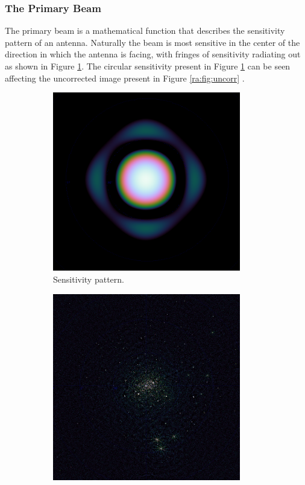 \subsubsection{The Primary Beam}\label{ra:ssec:tpb}
The primary beam is a mathematical function that describes the sensitivity pattern of an antenna. Naturally the beam is most sensitive in the center of the direction in which the antenna is facing, with fringes of sensitivity radiating out as shown in Figure \ref{ra:fig:beam}. The circular sensitivity present in Figure \ref{ra:fig:beam} can be seen affecting the uncorrected image present in Figure \ref{ra:fig:uncorr} \citep{thompson2008interferometry}.
%
\begin{figure}[H]
  \begin{subfigure}{0.45\textwidth}
	\centering
	\includegraphics[width=0.9\textwidth]{Images/beam.png}
	\caption{Sensitivity pattern.}
	\label{ra:fig:beam}
  \end{subfigure}
  \begin{subfigure}{0.45\textwidth}
	\centering
	\includegraphics[width=0.9\textwidth]{Images/uncorrected-image.png}

\end{subfigure}
\end{figure}
